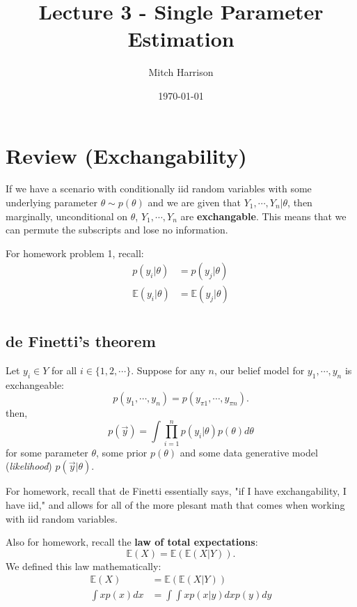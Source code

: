 \documentclass[titlepage, 12pt, leqno]{article}
\title{\Huge{Lecture 3 - Single Parameter Estimation}}
\author{\large{Mitch Harrison}}
\date{\today}
\begin{document}
\setlength{\parskip}{1\baselineskip}
\setlength{\parindent}{15pt}
\maketitle
\tableofcontents
\newpage


\section{Review (Exchangability)}

If we have a scenario with conditionally iid random variables with some underlying
parameter $\theta \sim p(\theta)$ and we are given that $Y_1, \cdots , Y_n |
\theta$, then marginally, unconditional on $\theta$, $Y_1, \cdots ,Y_n$ are
\textbf{exchangable}. This means that we can permute the subscripts and lose no
information.

\begin{note}
    For homework problem 1, recall:
    \begin{align*}
        p(y_i|\theta) &= p(y_j|\theta) \\
        \mathbb{E}(y_i|\theta) &= \mathbb{E}(y_j|\theta) \\
    \end{align*}
\end{note}

\subsection{de Finetti's theorem}
Let $y_i \in Y$ for all $i \in \{1,2, \cdots \}$. Suppose for any $n$, our belief
model for $y_1, \cdots , y_n$ is exchangeable:
\[
    p(y_1, \cdots ,y_n) = p(y_{\pi 1}, \cdots , y_{\pi n}).
\]
then,
\[
    p(\vec y) = \int \prod_{i=1}^{n}p(y_i|\theta)p(\theta)d \theta
\]
for some parameter $\theta$, some prior $p(\theta)$ and some data generative 
model (\textit{likelihood}) $p(\vec y | \theta)$.

\begin{note}
    For homework, recall that de Finetti essentially says, "if I have
    exchangability, I have iid," and allows for all of the more plesant math
    that comes when working with iid random variables.
\end{note}

\begin{note}
    Also for homework, recall the \textbf{law of total expectations}:
    \[
        \mathbb{E}(X) = \mathbb{E}( \mathbb{E}(X|Y)).
    \]
    We defined this law mathematically:
    \begin{align*}
        \mathbb{E}(X) &= \mathbb{E}( \mathbb{E}(X|Y)) \\
        \int xp(x)dx &= \int \int x p(x|y)dx p(y)dy
    \end{align*}
\end{note}
\end{document}
